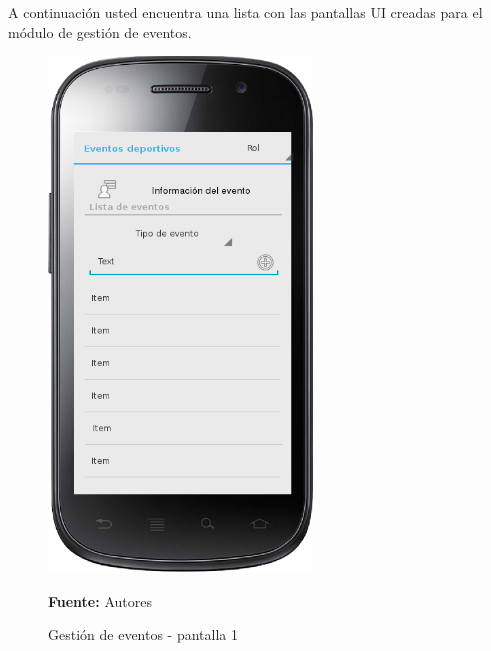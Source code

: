 A continuación usted encuentra una lista con las pantallas UI creadas para el módulo de gestión de eventos.

\begin{figure}[!htb]
  \begin{center}
    \includegraphics[width=7cm]{./imagenes/UI/Eventos/gestion_eventos_1.png}
    \caption{Gestión de eventos - pantalla 1}
    \label{fig:gestion_eventos_1}
    \textbf{Fuente:}  Autores
  \end{center}
\end{figure}

